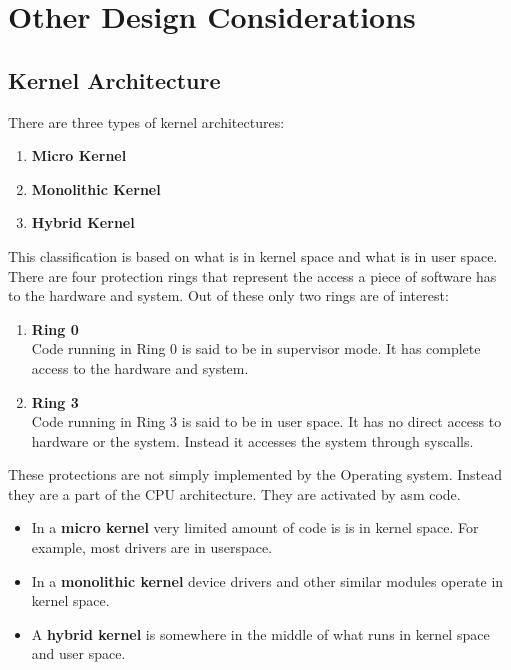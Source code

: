 \graphicspath{ {./diagrams/} }
\chapter{Other Design Considerations}\label{chapter:Other Design Considerations}

\section{Kernel Architecture}

\begin{flushleft}
	There are three types of kernel architectures:
		\begin{enumerate}
			\item \textbf{Micro Kernel}
			\item \textbf{Monolithic Kernel}
			\item \textbf{Hybrid Kernel}
		\end{enumerate}
	
	This classification is based on what is in kernel space and what is in user space. There are four
	protection rings that represent the access a piece of software has to the hardware and system. Out
	of these only two rings are of interest:
		\begin{enumerate}
			\item \textbf{Ring 0}\\
			Code running in Ring 0 is said to be in supervisor mode. It has complete access to the hardware
			and system.
			
			\item \textbf{Ring 3}\\
			Code running in Ring 3 is said to be in user space. It has no direct access to hardware or the
			system. Instead it accesses the system through syscalls.
		\end{enumerate}
	These protections are not simply implemented by the Operating system. Instead they are a part of
	the CPU architecture. They are activated by asm code.
	\begin{itemize}
		\item In a \textbf{micro kernel} very limited amount of code is is in kernel space. For example, most drivers are
		in userspace.
		\item In a \textbf{monolithic kernel} device drivers and other similar modules operate in kernel space.
		\item A \textbf{hybrid kernel} is somewhere in the middle of what runs in kernel space and user space.
	\end{itemize}


\end{flushleft}
